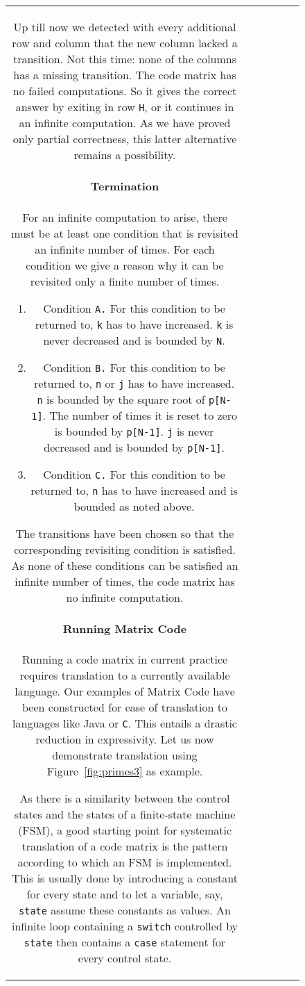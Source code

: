 \documentclass[preprint,11pt]{elsarticle}
\begin{document}
\begin{figure}[htbp]
\begin{center}
\begin{minipage}{4in}
\begin{tabular}{c|c|c|c|c|c}
{Up till now we detected with every additional
row and column that the new column lacked a transition.
Not this time: none of the columns has a missing transition.
The code matrix has no failed computations.
So it gives the correct answer by exiting in row \verb"H",
or it continues in an infinite computation.
As we have proved only partial correctness,
this latter alternative remains a possibility.

\paragraph{Termination}
For an infinite computation to arise,
there must be at least one condition
that is revisited an infinite number of times.
For each condition we give a reason why
it can be revisited only a finite number of times.

\begin{enumerate}
\item
Condition {\tt A.}
For this condition to be returned to,
{\tt k} has to have increased.
{\tt k} is never decreased and is bounded by {\tt N}.

\item
Condition {\tt B.}
For this condition to be returned to,
{\tt n} or {\tt j} has to have increased.
{\tt n} is bounded by the square root of 
{\tt p[N-1]}.
The number of times it is reset to zero is bounded by
{\tt p[N-1]}.
{\tt j} is never decreased and is bounded by {\tt p[N-1]}.
\item
Condition {\tt C.}
For this condition to be returned to,
{\tt n} has to have increased and is bounded as noted above.
\end{enumerate}

The transitions have been chosen
so that the corresponding revisiting condition
is satisfied.
As none of these conditions can be satisfied
an infinite number of times,
the code matrix has no infinite computation.

\paragraph{Running Matrix Code}
Running a code matrix in current practice
requires translation to a currently available language.
Our examples of Matrix Code have been constructed
for ease of translation to languages like Java or {\tt C}.
This entails a drastic reduction in expressivity.
Let us now demonstrate translation
using Figure~\ref{fig:primes3} as example.

As there is a similarity between the control states
and the states of a finite-state machine (FSM),
a good starting point for systematic translation
of a code matrix is the pattern according to which
an FSM is implemented.
This is usually done by introducing a constant for every
state and to let a variable, say, \verb"state"
assume these constants as values.
An infinite loop containing a \verb"switch" controlled by
\verb"state" then contains a \verb"case" statement
for every control state.


}
\end{tabular}
\end{minipage}
\end{center}
\end{figure}
\end{document}
